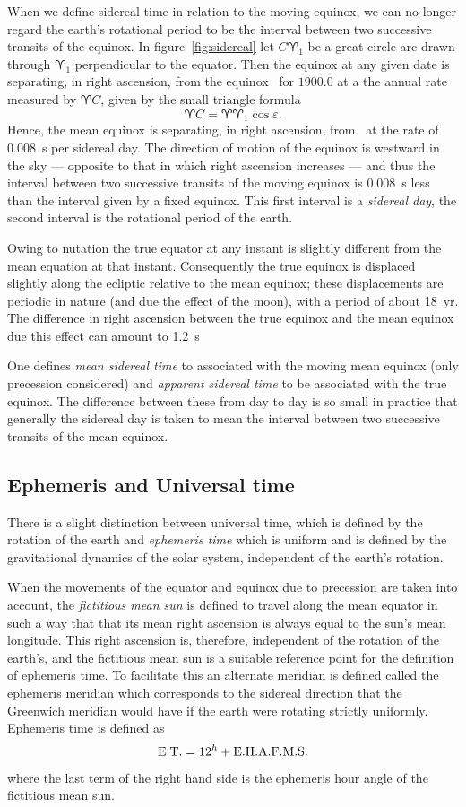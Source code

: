 When we define sidereal time in relation to the moving equinox, we can no longer 
regard the earth's rotational period to be the interval between two successive transits
of the equinox. In figure~\ref{fig:sidereal} let $C\aries_1$ be a great circle arc
drawn through $\aries_1$ perpendicular to the equator. Then the equinox at any given 
date is separating, in right ascension, from the equinox \aries\  for $1900.0$ at a the
annual rate measured by $\aries C$, given by the small triangle formula
\[ 
\aries C=\aries\aries_1\cos\varepsilon.
\]
Hence, the mean equinox is separating, in right ascension, from \aries\  at the rate
of $0.008$~s per sidereal day. The direction of motion of the equinox is westward 
in the sky --- opposite to that in which right ascension increases --- and thus the 
interval between two successive transits of the moving equinox is $0.008$~s less than 
the interval given by a fixed equinox. This first interval is a {\it sidereal day}, 
the second interval is the rotational period of the earth.

Owing to nutation the true equator at any instant is slightly different from the 
mean equation at that instant. Consequently the true equinox is displaced slightly 
along the ecliptic relative to the mean equinox; these displacements are periodic
in nature (and due the effect of the moon), with a period of about 18~yr. 
The difference in right ascension between the true equinox and the mean equinox due 
this effect can amount to 1.2~s

One defines {\it mean sidereal time} to associated with the moving mean equinox 
(only precession considered) and {\it apparent sidereal time} to be associated 
with the true equinox. The difference between these from day to day is so small
in practice that generally the sidereal day is taken to mean the interval between
two successive transits of the mean equinox.

\subsection{Ephemeris and Universal time}

There is a slight distinction between universal time, which is defined by the 
rotation of the earth and {\it ephemeris time} which is uniform and is defined
by the gravitational dynamics of the solar system, independent of the earth's 
rotation.

When the movements of the equator and equinox due to precession are taken into
account, the {\it fictitious mean sun} is defined to travel along the mean 
equator in such a way that that its mean right ascension is always equal to 
the sun's mean longitude. This right ascension is, therefore, independent 
of the rotation of the earth's, and the fictitious mean sun is a 
suitable reference point for the definition of ephemeris time. To 
facilitate this an alternate meridian is defined called the ephemeris 
meridian which corresponds to the sidereal direction that the
Greenwich meridian would have if the earth were rotating strictly uniformly. 
Ephemeris time is defined as 
\[
{\rm E.T.}=12^h+{\rm E.H.A.F.M.S.}
\]
where the last term of the right hand side is the ephemeris hour angle of the 
fictitious mean sun. 

